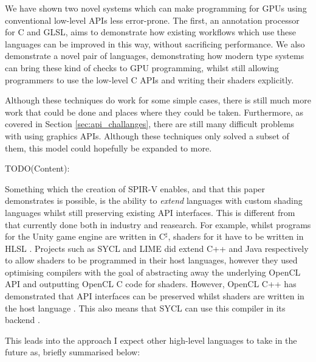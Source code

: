 \documentclass[a4paper,12pt,twoside,openright]{report}
\begin{document}
We have shown two novel systems which can make programming for GPUs using
conventional low-level APIs less error-prone. The first, an annotation
processor for C and GLSL, aims to demonstrate how existing workflows which use
these languages can be improved in this way, without sacrificing performance.
We also demonstrate a novel pair of languages, demonstrating how modern type
systems can bring these kind of checks to GPU programming, whilst still
allowing programmers to use the low-level C APIs and writing their shaders
explicitly.

Although these techniques do work for some simple cases, there is still much
more work that could be done and places where they could be taken. Furthermore,
as covered in Section \ref{sec:api_challanges}, there are still many difficult
problems with using graphics APIs. Although these techniques only solved a
subset of them, this model could hopefully be expanded to more.

TODO(Content):



Something which the creation of SPIR-V enables, and that this paper
demonstrates is possible, is the ability to \textit{extend} languages with
custom shading languages whilst still preserving existing API interfaces. This
is different from that currently done both in industry and reasearch. For
example, whilst programs for the Unity game engine are written in C$^\sharp$,
shaders for it have to be written in HLSL \cite{TODO}. Projects such as SYCL
and LIME did extend C++ and Java respectively to allow shaders to be programmed
in their host languages, however they used optimising compilers with the goal
of abstracting away the underlying OpenCL API and outputting OpenCL C code for
shaders. However, OpenCL C++ has demonstrated that API interfaces can be
preserved whilst shaders are written in the host language
\cite{OpenCLCPPWhitePaper}. This also means that SYCL can use this compiler in
its backend \cite{TODO}.

This leads into the approach I expect other high-level languages to take in the
future as, briefly summarised below:
\end{document}
